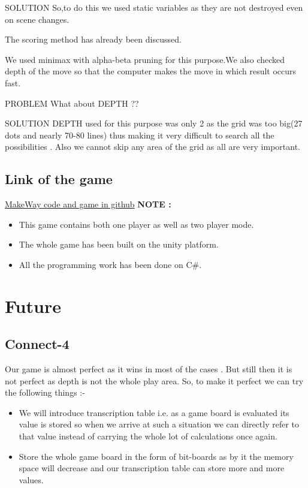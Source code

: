 \documentclass[11pt]{article}
\begin{document}
{\color{green}SOLUTION }So,to do this we used static variables as they are not destroyed even on scene changes.

The scoring method has already been discussed.

We used minimax with alpha-beta pruning for this purpose.We also checked depth of the move so that the computer makes the move in which result occurs fast.

{\color{red}PROBLEM }What about DEPTH ??

{\color{green}SOLUTION }DEPTH used for this purpose was only 2 as the grid was too big(27 dots and nearly 70-80 lines) thus making it very difficult to search all the possibilities . Also we cannot skip any area of the grid as all are very important. 

\subsection{Link of the game}
\href{https://github.com/shubham0405/MAKEWAY}{\color{blue}MakeWay code and game in github}\linebreak \linebreak
\textbf{NOTE :}
\begin{itemize}
    \item This game contains both one player as well as two player mode.
\item The whole game has been built on the unity platform.
\item All the programming work has been done on C\#.
\end{itemize}



\pagebreak
\section{Future}
\subsection{Connect-4}
Our game is almost perfect as it wins in most of the cases . But still then it is not perfect as depth is not the whole play area. So, to make it perfect we can try the following things :-
\begin{itemize}
\item We will introduce transcription table i.e. as a game board is evaluated its value is stored so when we arrive at such a situation we can directly refer to that value instead of carrying the whole lot of calculations once again.
\item Store the whole game board in the form of bit-boards as by it the memory space will decrease and our transcription table can store more and more values.
\end{itemize}
\end{document}
